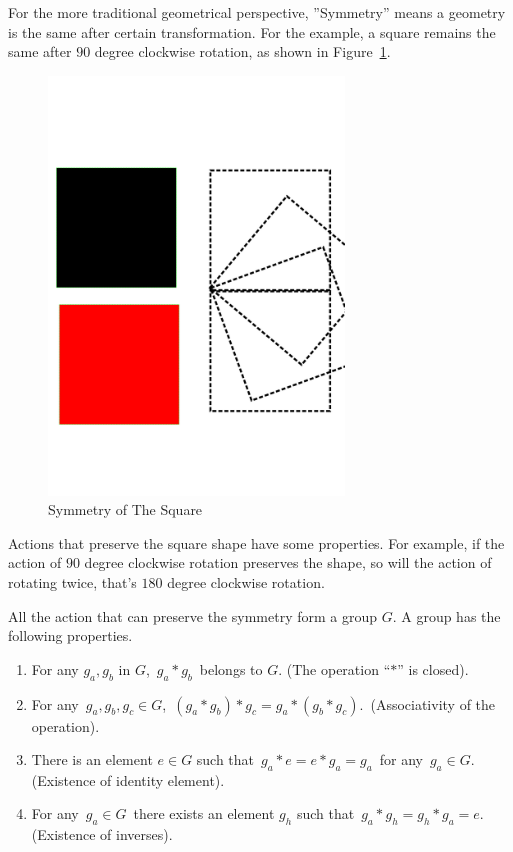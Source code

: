 For the more traditional geometrical perspective, ''Symmetry''  means a geometry is the same after certain transformation.
For the example, a square remains the same after  $90$ degree clockwise rotation, as shown in Figure~\ref{fig:symsquare}.
\begin{figure}[!htbp]
  	\begin{center}
   	\includegraphics[width=0.7\textwidth]{Symmetry}
	\end{center}
	\caption{Symmetry of The Square}
    \label{fig:symsquare}
\end{figure}

Actions that preserve the square shape have some properties.
For example, if the action of $90$ degree clockwise rotation preserves the shape, so will the action of rotating twice, that's $180$ degree clockwise rotation.

All the action that can preserve the symmetry form a group $G$.
A group has the following properties.
\begin{enumerate}
\item For any $g_a,g_b$ in $G$, \,$g_a*g_b$\, belongs to $G$. (The operation ``$*$'' is closed).

\item For any \,$g_a,g_b,g_c\in G$, \,$(g_a*g_b)*g_c=g_a*(g_b*g_c)$. \,(Associativity of the operation).

\item There is an element $e\in G$ such that \,$g_a*e=e*g_a=g_a$\, for any \,$g_a\in G$. (Existence of identity element).

\item For any \,$g_a\in G$\, there exists an element $g_h$ such that \,$g_a*g_h=g_h*g_a=e$. \,(Existence of inverses).
\end{enumerate}

